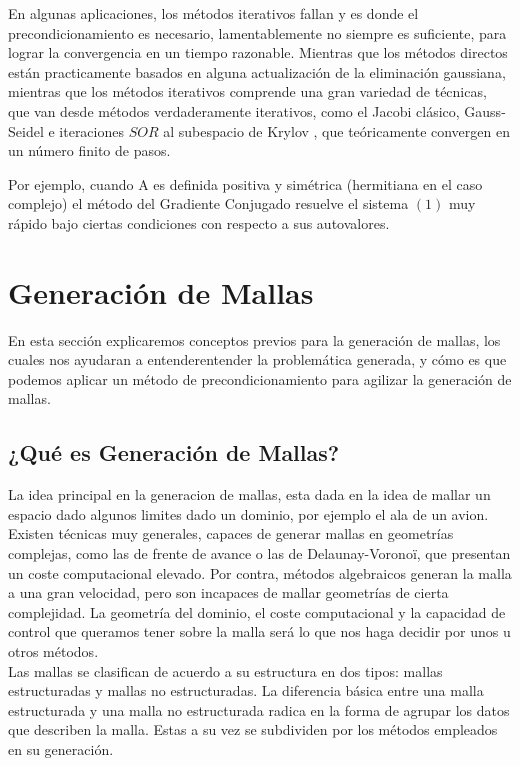 \documentclass[11pt,letterpaper]{article}
\begin{document}
En algunas aplicaciones, los métodos iterativos fallan y es donde el precondicionamiento es necesario, lamentablemente no siempre es suficiente, para lograr la convergencia en un tiempo razonable.
Mientras que los métodos directos están practicamente basados en alguna actualización de la eliminación gaussiana, mientras que los métodos iterativos comprende una gran variedad de técnicas, que van desde métodos verdaderamente iterativos, como el Jacobi clásico, Gauss-Seidel e iteraciones $SOR$ al subespacio de Krylov , que teóricamente convergen en un número finito de pasos.

Por ejemplo, cuando A es definida positiva y simétrica (hermitiana en el caso complejo) el método del Gradiente Conjugado resuelve el sistema $(1)$ muy rápido bajo ciertas condiciones con respecto a sus autovalores.



\section{Generación de Mallas}
En esta sección explicaremos conceptos previos para la generación de mallas, los cuales nos ayudaran a entenderentender la problemática generada, y cómo es que podemos aplicar un m\'etodo de precondicionamiento para agilizar la generaci\'on de mallas.

\subsection{¿Qué es Generación de Mallas?}

La idea principal en la generacion de mallas, esta dada en la idea de mallar un espacio dado algunos limites dado un dominio, por ejemplo el ala de un avion. Existen técnicas muy generales, capaces de generar mallas en geometrías complejas, como las de frente de avance o las de Delaunay-Voronoï, que presentan un coste computacional elevado. Por contra, métodos algebraicos generan la malla a una gran velocidad, pero son incapaces de mallar geometrías de cierta complejidad. La geometría del dominio, el coste computacional y la capacidad de control que queramos tener sobre la malla será lo que nos haga decidir por unos u otros métodos.\\

Las mallas se clasifican de acuerdo a su estructura en dos tipos: mallas estructuradas y mallas no estructuradas. La diferencia básica entre una malla estructurada y una malla no estructurada radica en la forma de agrupar los datos que describen la malla. Estas a su vez se subdividen por los métodos empleados en su generación.\\
\end{document}
